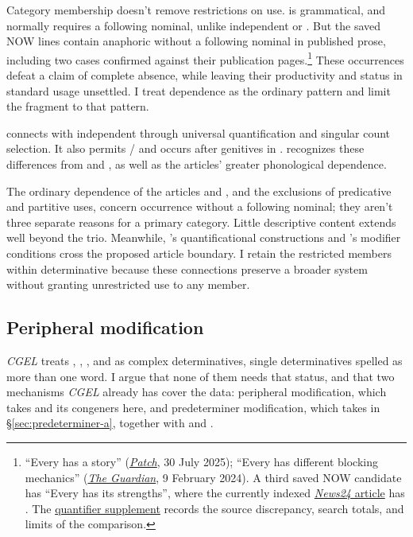 \documentclass[12pt]{article}
\begin{document}
Category membership doesn't remove restrictions on use.  is grammatical, and  normally requires a following nominal, unlike independent  or . But the saved NOW lines contain anaphoric  without a following nominal in published prose, including two cases confirmed against their publication pages.\footnote{\enquote{Every has a story} (\href{https://patch.com/california/temecula/attention-detail-monument-refresh-underway-across-all-temecula-city-parks}{\textit{Patch}}, 30 July 2025); \enquote{Every has different blocking mechanics} (\href{https://www.theguardian.com/sport/2024/feb/09/super-bowl-chiefs-49ers-travis-kelce-tony-romo}{\textit{The Guardian}}, 9 February 2024). A third saved NOW candidate has \enquote{Every has its strengths}, where the currently indexed \href{https://www.news24.com/life/motoring/new-models/toyota-launches-new-corolla-in-sa-why-it-took-so-long-for-the-car-to-be-introduced-20200501-2}{\textit{News24} article} has . The \href{run:quantifier-controls.pdf}{quantifier supplement} records the source discrepancy, search totals, and limits of the comparison.} These occurrences defeat a claim of complete absence, while leaving their productivity and status in standard usage unsettled. I treat dependence as the ordinary pattern and limit the fragment to that pattern.

 connects with independent  through universal quantification and singular count selection. It also permits / and occurs after genitives in . \textcite[156--158]{spinillo2004reconceptualising} recognizes these differences from  and , as well as the articles' greater phonological dependence.

The ordinary dependence of the articles and , and the exclusions of predicative and partitive uses, concern occurrence without a following nominal; they aren't three separate reasons for a primary category. Little descriptive content extends well beyond the trio. Meanwhile, 's quantificational constructions and 's modifier conditions cross the proposed article boundary. I retain the restricted members within determinative because these connections preserve a broader system without granting unrestricted use to any member.

\subsection{Peripheral modification}\label{sec:complex-determinatives}
\textit{CGEL} treats , , , and  as complex determinatives, single determinatives spelled as more than one word. I argue that none of them needs that status, and that two mechanisms \textit{CGEL} already has cover the data: peripheral modification, which takes  and its congeners here, and predeterminer modification, which takes  in §\ref{sec:predeterminer-a}, together with  and .
\end{document}
